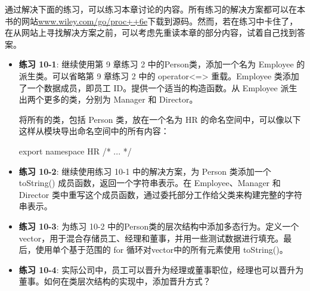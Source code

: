 通过解决下面的练习，可以练习本章讨论的内容。所有练习的解决方案都可以在本书的网站\url{www.wiley.com/go/proc++6e}下载到源码。然而，若在练习中卡住了，在从网站上寻找解决方案之前，可以考虑先重读本章的部分内容，试着自己找到答案。

\begin{itemize}
\item
\textbf{练习 10-1}: 继续使用第 9 章练习 2 中的Person类，添加一个名为 Employee 的派生类。可以省略第 9 章练习 2 中的 operator<=> 重载。Employee 类添加了一个数据成员，即员工 ID。提供一个适当的构造函数。从 Employee 派生出两个更多的类，分别为 Manager 和 Director。

将所有的类，包括 Person 类，放在一个名为 HR 的命名空间中，可以像以下这样从模块导出命名空间中的所有内容：

\begin{cpp}
export namespace HR { /* ... */ }
\end{cpp}

\item
\textbf{练习 10-2}: 继续使用练习 10-1 中的解决方案，为 Person 类添加一个 toString() 成员函数，返回一个字符串表示。在 Employee、Manager 和 Director 类中重写这个成员函数，通过委托部分工作给父类来构建完整的字符串表示。

\item
\textbf{练习 10-3}: 为练习 10-2 中的Person类的层次结构中添加多态行为。定义一个vector，用于混合存储员工、经理和董事，并用一些测试数据进行填充。最后，使用单个基于范围的 for 循环对vector中的所有元素使用 toString()。

\item
\textbf{练习 10-4}: 实际公司中，员工可以晋升为经理或董事职位，经理也可以晋升为董事。如何在类层次结构的实现中，添加晋升方式？
\end{itemize}


